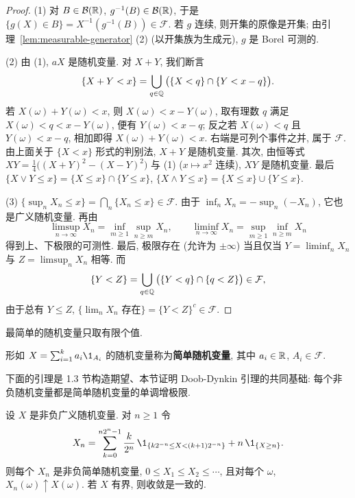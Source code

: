 \begin{proof}
(1) 对 $B\in\mathcal{B}(\mathbb{R})$, $g^{-1}(B)\in\mathcal{B}(\mathbb{R})$, 于是 $\{g(X)\in B\}=X^{-1}(g^{-1}(B))\in\mathcal{F}$. 若 $g$ 连续, 则开集的原像是开集; 由引理~\ref{lem:measurable-generator} (2) (以开集族为生成元), $g$ 是 Borel 可测的.

(2) 由 (1), $aX$ 是随机变量. 对 $X+Y$, 我们断言
\[
\{X+Y<x\}=\bigcup_{q\in\mathbb{Q}}\big(\{X<q\}\cap\{Y<x-q\}\big).
\]
若 $X(\omega)+Y(\omega)<x$, 则 $X(\omega)<x-Y(\omega)$, 取有理数 $q$ 满足 $X(\omega)<q<x-Y(\omega)$, 便有 $Y(\omega)<x-q$; 反之若 $X(\omega)<q$ 且 $Y(\omega)<x-q$, 相加即得 $X(\omega)+Y(\omega)<x$. 右端是可列个事件之并, 属于 $\mathcal{F}$. 由上面关于 $\{X<x\}$ 形式的判别法, $X+Y$ 是随机变量. 其次, 由恒等式 $XY=\frac{1}{4}\big((X+Y)^2-(X-Y)^2\big)$ 与 (1) ($x\mapsto x^2$ 连续), $XY$ 是随机变量. 最后 $\{X\vee Y\le x\}=\{X\le x\}\cap\{Y\le x\}$, $\{X\wedge Y\le x\}=\{X\le x\}\cup\{Y\le x\}$.

(3) $\{\sup_n X_n\le x\}=\bigcap_n\{X_n\le x\}\in\mathcal{F}$. 由于 $\inf_n X_n=-\sup_n(-X_n)$, 它也是广义随机变量. 再由
\[
\limsup_{n\to\infty}X_n=\inf_{m\ge1}\sup_{n\ge m}X_n,\qquad \liminf_{n\to\infty}X_n=\sup_{m\ge1}\inf_{n\ge m}X_n
\]
得到上、下极限的可测性. 最后, 极限存在 (允许为 $\pm\infty$) 当且仅当 $Y=\liminf_n X_n$ 与 $Z=\limsup_n X_n$ 相等. 而
\[
\{Y<Z\}=\bigcup_{q\in\mathbb{Q}}\big(\{Y<q\}\cap\{q<Z\}\big)\in\mathcal{F},
\]
由于总有 $Y\le Z$, $\{\lim_n X_n\text{ 存在}\}=\{Y<Z\}^c\in\mathcal{F}$.
\end{proof}

最简单的随机变量只取有限个值.

\begin{definition}[简单随机变量]\label{def:simple}
形如 $X=\sum_{i=1}^k a_i\1_{A_i}$ 的随机变量称为\textbf{简单随机变量}, 其中 $a_i\in\mathbb{R}$, $A_i\in\mathcal{F}$.
\end{definition}

下面的引理是 1.3 节构造期望、本节证明 Doob-Dynkin 引理的共同基础: 每个非负随机变量都是简单随机变量的单调增极限.

\begin{lemma}[简单函数逼近]\label{lem:simple-approx}
设 $X$ 是非负广义随机变量. 对 $n\ge1$ 令
\[
X_n=\sum_{k=0}^{n2^n-1}\frac{k}{2^n}\,\1_{\{k2^{-n}\le X<(k+1)2^{-n}\}}+n\,\1_{\{X\ge n\}}.
\]
则每个 $X_n$ 是非负简单随机变量, $0\le X_1\le X_2\le\cdots$, 且对每个 $\omega$, $X_n(\omega)\uparrow X(\omega)$. 若 $X$ 有界, 则收敛是一致的.
\end{lemma}

